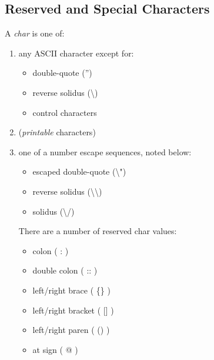\documentclass{memarticle}
\begin{document}
{                \subsection{Reserved and Special Characters}
                        A \emph{char} is one of:
                        \begin{enumerate}
                                \item any ASCII character except for:
                                \begin{itemize}
                                        \item double-quote ('') 
                                        \item reverse solidus (\textbackslash)
                                        \item control characters
                                \end{itemize}
                                \item (\emph{printable} characters)
                                \item one of a number escape sequences, noted below:
                                \begin{itemize}
                                        \item escaped double-quote (\textbackslash")
                                        \item reverse solidus (\textbackslash\textbackslash)
                                        \item solidus (\textbackslash/)
                                \end{itemize}
                                There are a number of reserved char values:
                                \begin{itemize}
                                        \item colon ( : )
                                        \item double colon ( :: )
                                        \item left/right brace ( \{\} )
                                        \item left/right bracket ( [] )
                                        \item left/right paren ( () )
                                        \item at sign ( @ )
                                \end{itemize}           
                        \end{enumerate}
}
\end{document}
